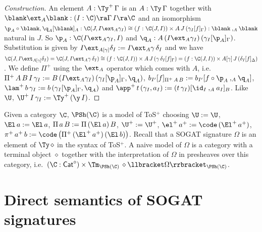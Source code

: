 \begin{proof}[Construction]
  An element $A : \Ty^+\,\Gamma$ is an $A : \Ty\,\Gamma$ together with
  $\blank\ext_A\blank : (I:\C)\ra\Gamma\,I\ra\C$ and an isomorphism
  $\p_A\circ\blank,\q_A[\blank]_A : \C(J,I\ext_A\gamma_I) \cong
  (f:\C(J,I))\times A\,J\,(\gamma_I[f]_\Gamma) :
  \blank\mathbin{,_A}\blank$ natural in $J$. So
  $\p_A:\C(I\ext_A\gamma_I,I)$ and
  $\q_A:A\,(I\ext_A\gamma_I)\,(\gamma_I[\p_A]_\Gamma)$. Substitution
  is given by $I\ext_{A[\gamma]}\delta_I := I\ext_A\gamma\,\delta_I$
  and we have $\C(J,I\ext_{A[\gamma]}\delta_I) =
  \C(J,I\ext_A\gamma\,\delta_I) \cong (f:\C(J,I))\times
  A\,J\,(\gamma\,\delta_I[f]_\Gamma) = (f:\C(J,I))\times
  A[\gamma]\,J\,(\delta_I[f]_\Delta)$. We define $\Pi^+$ using the
  $\ext_A$ operator which comes with $A$,
  i.e.\ $\Pi^+\,A\,B\,I\,\gamma_I :=
  B\,(I\ext_A\gamma_I)\,(\gamma_I[\p_A]_\Gamma, \q_A)$,
  $b_{I'}[f]_{\Pi^+\,A\,B} := b_{I'}[f\circ\p_A\mathbin{,_A}\q_A]$,
  $\lam^+\,b\,\gamma_I := b\,(\gamma_I[\p_A]_\Gamma,\q_A)$ and
  $\app^+\,t\,(\gamma_I,a_I) :=
  (t\,\gamma_I)[\id_I\mathbin{,_A}a_I]_B$. Like $\U$,
  $\U^+\,I\,\gamma_I := \Ty^+\,(\y\,I)$.
\end{proof}
\begin{definition}\label{def:naive}
  Given a category $\C$, $\PSh(\C)$ is a model of ToS$^+$ choosing $\U := \U$, $\El\,a := \El\,a$, $\Pi\,a\,B :=
  \Pi\,(\El\,a)\,B$, $\U^+ := \U^+$, $\el^+\,a^+ :=
  \code\,(\El^+\,a^+)$, $\pi^+\,a^+\,b :=
  \code\,\big(\Pi^+\,(\El^+\,a^+)\,(\El\,b)\big)$. Recall that a SOGAT
  signature $\Omega$ is an element of $\Ty\,\diamond$ in the syntax of ToS$^+$.
  A naive model of $\Omega$ is a category with a
  terminal object $\diamond$ together with the interpretation of $\Omega$ in
  presheaves over this category, i.e.\ 
  $(\C:\mathsf{Cat}^\diamond)\times\Tm_{\PSh(\C)}\,\diamond\llbracket\Omega
  \rrbracket_{\PSh(\C)}$.
\end{definition}
\setcounter{theorem}{18}
\section{Direct semantics of SOGAT signatures}
\label{sec:warmup}

